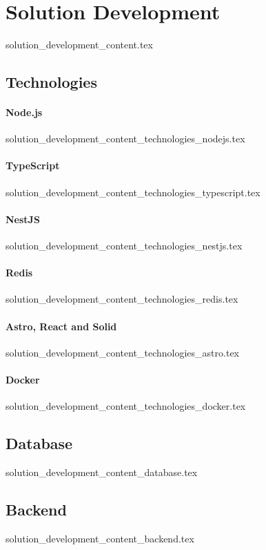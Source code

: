 \chapter{Solution Development}
  {solution_development_content.tex}

\section{Technologies}\label{sub:technologies}
\subsubsection*{Node.js}
  {solution_development_content_technologies_nodejs.tex}
\subsubsection*{TypeScript}
  {solution_development_content_technologies_typescript.tex}
  \subsubsection*{NestJS}
  {solution_development_content_technologies_nestjs.tex}
\subsubsection*{Redis}\label{sub:redis}
  {solution_development_content_technologies_redis.tex}
\subsubsection*{Astro, React and Solid}\label{sub:astro}
  {solution_development_content_technologies_astro.tex}
\subsubsection*{Docker}\label{sub:docker}
  {solution_development_content_technologies_docker.tex}

\section{Database}
  {solution_development_content_database.tex}

\section{Backend}
  {solution_development_content_backend.tex}
